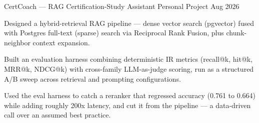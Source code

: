 

\begin{cventries}

  \cventry
    {CertCoach --- RAG Certification-Study Assistant} %
    {Personal Project} %
    {} %
    {Aug 2026} %
    {
      \begin{cvitems} %
        \item {Designed a hybrid-retrieval RAG pipeline --- dense vector search (pgvector) fused with Postgres full-text (sparse) search via Reciprocal Rank Fusion, plus chunk-neighbor context expansion.}
        \item {Built an evaluation harness combining deterministic IR metrics (recall@k, hit@k, MRR@k, NDCG@k) with cross-family LLM-as-judge scoring, run as a structured A/B sweep across retrieval and prompting configurations.}
        \item {Used the eval harness to catch a reranker that regressed accuracy (0.761 to 0.664) while adding roughly 200x latency, and cut it from the pipeline --- a data-driven call over an assumed best practice.}
      \end{cvitems}
    }

\end{cventries}
